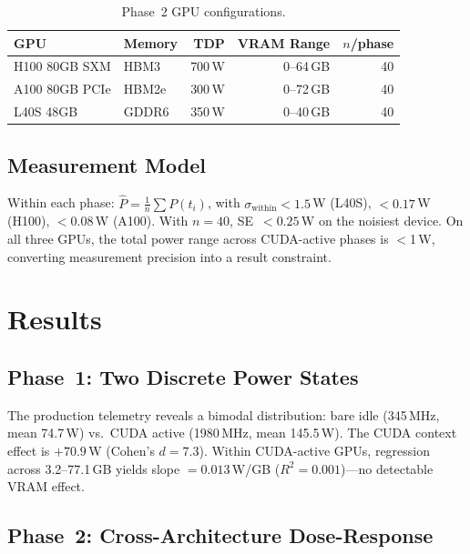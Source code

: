 \documentclass[sigconf,nonacm]{acmart}
\begin{document}
\begin{table}[t]
\caption{Phase~2 GPU configurations.}
\label{tab:gpus}
\small
\begin{tabular}{llrrr}
\toprule
\textbf{GPU} & \textbf{Memory} & \textbf{TDP} & \textbf{VRAM Range} & $n$/\textbf{phase} \\
\midrule
H100 80GB SXM & HBM3 & 700\,W & 0--64\,GB & 40 \\
A100 80GB PCIe & HBM2e & 300\,W & 0--72\,GB & 40 \\
L40S 48GB & GDDR6 & 350\,W & 0--40\,GB & 40 \\
\bottomrule
\end{tabular}
\end{table}

\subsection{Measurement Model}
\label{sec:measurement}

Within each phase: $\hat{P} = \frac{1}{n}\sum P(t_i)$, with $\sigma_{\text{within}} < 1.5$\,W (L40S), $< 0.17$\,W (H100), $< 0.08$\,W (A100). With $n=40$, SE~$< 0.25$\,W on the noisiest device. On all three GPUs, the total power range across CUDA-active phases is $<$1\,W, converting measurement precision into a result constraint.

\section{Results}

\subsection{Phase~1: Two Discrete Power States}

The production telemetry reveals a bimodal distribution: bare idle (345\,MHz, mean 74.7\,W) vs.\ CUDA active (1980\,MHz, mean 145.5\,W). The CUDA context effect is $+70.9$\,W (Cohen's $d = 7.3$). Within CUDA-active GPUs, regression across 3.2--77.1\,GB yields slope $= 0.013$\,W/GB ($R^2 = 0.001$)---no detectable VRAM effect.

\subsection{Phase~2: Cross-Architecture Dose-Response}
\end{document}
